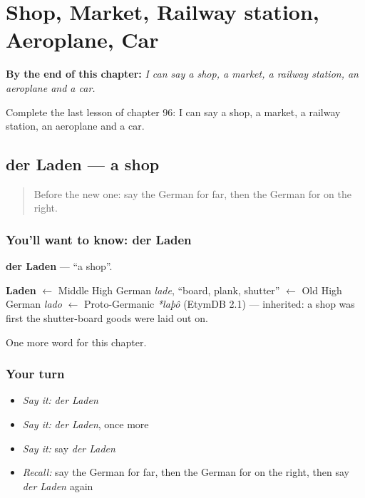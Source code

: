 
\chapter{Shop, Market, Railway station, Aeroplane, Car}
\label{ch:ge-shop-market-railway-station-aeroplane-car}

\begin{chapteropening}
\textbf{By the end of this chapter:} \emph{I can say a shop, a market, a railway station, an aeroplane and a car.}

Complete the last lesson of chapter 96: I can say a shop, a market, a railway station, an aeroplane and a car.
\end{chapteropening}

\section[der Laden]{der Laden — a shop}

\label{lesson:GE-C96-laden}



\begin{quote}
Before the new one: say the German for far, then the German for on the right.
\end{quote}

\subsection*{You'll want to know: der Laden}
\textbf{der Laden} — \textquotedblleft{}a shop\textquotedblright{}.

\begin{cousinweb}
\textbf{Laden} $\leftarrow$ Middle High German \emph{lade}, \textquotedblleft{}board, plank, shutter\textquotedblright{} $\leftarrow$ Old High German \emph{lado} $\leftarrow$ Proto-Germanic \emph{*laþô} (EtymDB 2.1) — inherited: a shop was first the shutter-board goods were laid out on.
\end{cousinweb}

\begin{grammarlens}[title={What you've built}]
One more word for this chapter.
\end{grammarlens}

\subsection*{Your turn}
\begin{itemize}
\raggedright
  \item \emph{Say it:} \emph{der Laden}
  \item \emph{Say it:} \emph{der Laden}, once more
  \item \emph{Say it:} say \emph{der Laden}
  \item \emph{Recall:} say the German for far, then the German for on the right, then say \emph{der Laden} again
\end{itemize}

